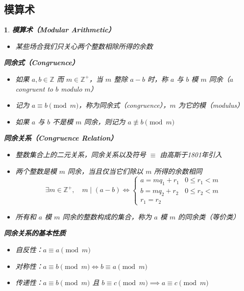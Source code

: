 \documentclass[UTF8]{report}
\theoremstyle{MyLineTheoremStyle} %
\theoremstyle{MyBlockTheoremStyle} %
\theoremstyle{MySubsubsectionStyle} %
\newtheorem{definition}{}
\begin{document}
\subsection{模算术}

\begin{definition}
    \textbf{模算术（Modular Arithmetic）}
    \begin{itemize}
        \item 某些场合我们只关心两个整数相除所得的余数
    \end{itemize}

    \textbf{同余式（Congruence）}
    \begin{itemize}
        \item 如果 $a, b \in \mathbb{Z}$ 而 $m \in \mathbb{Z}^+$，当 $m$ 整除 $a - b$ 时，称 $a$ 与 $b$ 模 $m$ 同余（$a$ congruent to $b$ modulo $m$）
        \item 记为 $a \equiv b \pmod{m}$，称为同余式（congruence），$m$ 为它的模（modulus）
        \item 如果 $a$ 与 $b$ 不是模 $m$ 同余，则记为 $a \not\equiv b \pmod{m}$
    \end{itemize}

    \textbf{同余关系（Congruence Relation）}
    \begin{itemize}
        \item 整数集合上的二元关系，同余关系以及符号 $\equiv$ 由高斯于1801年引入
        \item 两个整数是模 $m$ 同余，当且仅当它们除以 $m$ 所得的余数相同
        \[
        \exists m \in \mathbb{Z}^+, \quad m \mid (a - b) \iff 
        \begin{cases} 
            a = mq_1 + r_1 & 0 \leq r_1 < m \\
            b = mq_2 + r_2 & 0 \leq r_2 < m \\
            r_1 = r_2 
        \end{cases}
        \]
        \item 所有和 $a$ 模 $m$ 同余的整数构成的集合，称为 $a$ 模 $m$ 的同余类（等价类）
    \end{itemize}

    \textbf{同余关系的基本性质}
    \begin{itemize}
        \item 自反性：$a \equiv a \pmod{m}$
        \item 对称性：$a \equiv b \pmod{m} \iff b \equiv a \pmod{m}$
        \item 传递性：$a \equiv b \pmod{m}$ 且 $b \equiv c \pmod{m} \implies a \equiv c \pmod{m}$
    \end{itemize}


\end{definition}
\end{document}
